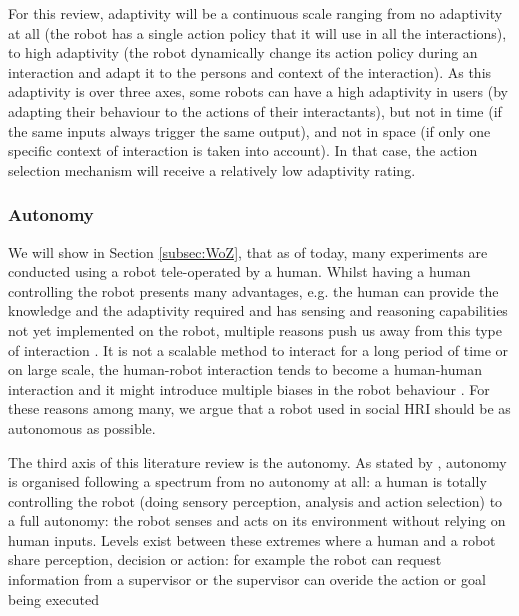     For this review, adaptivity will be a continuous scale ranging from no adaptivity at all (the robot has a single action policy that it will use in all the interactions), to high adaptivity (the robot dynamically change its action policy during an interaction and adapt it to the persons and context of the interaction). As this adaptivity is over three axes, some robots can  have a high adaptivity in users (by adapting their behaviour to the actions of their interactants), but not in time (if the same inputs always trigger the same output), and not in space (if only one specific context of interaction is taken into account). In that case, the action selection mechanism will receive a relatively low adaptivity rating.

\subsubsection{Autonomy}
    We will show in Section \ref{subsec:WoZ}, that as of today, many experiments are conducted using a robot tele-operated by a human. Whilst having a human controlling the robot presents many advantages, e.g. the human can provide the knowledge and the adaptivity required and has sensing and reasoning capabilities not yet implemented on the robot, multiple reasons push us away from this type of interaction \citet{Thill2013}. It is not a scalable method to interact for a long period of time or on large scale, the human-robot interaction tends to become a human-human interaction \citep{baxter2016characterising} and it might introduce multiple biases in the robot behaviour \citep{howley2014effects}. For these reasons among many, we argue that a robot used in social HRI should be as autonomous as possible.
	
    The third axis of this literature review is the autonomy. As stated by \citet{beer2014toward}, autonomy is organised following a spectrum from no autonomy at all: a human is totally controlling the robot (doing sensory perception, analysis and action selection) to a full autonomy: the robot senses and acts on its environment without relying on human inputs. Levels exist between these extremes where a human and a robot share perception, decision or action: for example the robot can request information from a supervisor or the supervisor can overide the action or goal being executed
    

